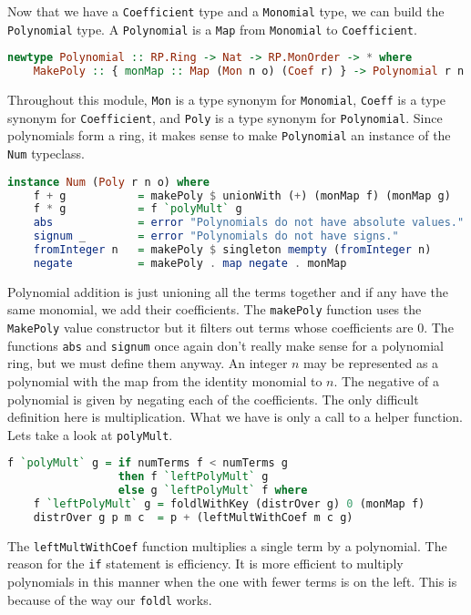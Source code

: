\documentclass[MS, xcolor=dvipsnames]{wfuthesis}
\theoremstyle{definition}
\begin{document}
Now that we have a \lstinline{Coefficient} type and a \lstinline{Monomial} type, we can build the \lstinline{Polynomial} type. A \lstinline{Polynomial} is a \lstinline{Map} from \lstinline{Monomial} to \lstinline{Coefficient}. 
\begin{lstlisting}[language=Haskell]
newtype Polynomial :: RP.Ring -> Nat -> RP.MonOrder -> * where
    MakePoly :: { monMap :: Map (Mon n o) (Coef r) } -> Polynomial r n o
\end{lstlisting}
Throughout this module, \lstinline{Mon} is a type synonym for \lstinline{Monomial}, \lstinline{Coeff} is a type synonym for \lstinline{Coefficient}, and \lstinline{Poly} is a type synonym for \lstinline{Polynomial}. Since polynomials form a ring, it makes sense to make \lstinline{Polynomial} an instance of the \lstinline{Num} typeclass. 
\begin{lstlisting}[language=Haskell]
instance Num (Poly r n o) where
    f + g           = makePoly $ unionWith (+) (monMap f) (monMap g)
    f * g           = f `polyMult` g
    abs             = error "Polynomials do not have absolute values."
    signum _        = error "Polynomials do not have signs."
    fromInteger n   = makePoly $ singleton mempty (fromInteger n)
    negate          = makePoly . map negate . monMap
\end{lstlisting}
Polynomial addition is just unioning all the terms together and if any have the same monomial, we add their coefficients. The \lstinline{makePoly} function uses the \lstinline{MakePoly} value constructor but it filters out terms whose coefficients are 0. The functions \lstinline{abs} and \lstinline{signum} once again don't really make sense for a polynomial ring, but we must define them anyway. An integer $n$ may be represented as a polynomial with the map from the identity monomial to $n$. The negative of a polynomial is given by negating each of the coefficients. The only difficult definition here is multiplication. What we have is only a call to a helper function. Lets take a look at \lstinline{polyMult}. 
\begin{lstlisting}[language=Haskell]
f `polyMult` g = if numTerms f < numTerms g
                 then f `leftPolyMult` g
                 else g `leftPolyMult` f where
    f `leftPolyMult` g = foldlWithKey (distrOver g) 0 (monMap f)
    distrOver g p m c  = p + (leftMultWithCoef m c g)
\end{lstlisting}
The \lstinline{leftMultWithCoef} function multiplies a single term by a polynomial. The reason for the \lstinline{if} statement is efficiency. It is more efficient to multiply polynomials in this manner when the one with fewer terms is on the left. This is because of the way our \lstinline{foldl} works. \par 
\end{document}
